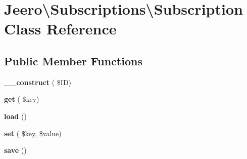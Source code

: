\hypertarget{classJeero_1_1Subscriptions_1_1Subscription}{}\section{Jeero\textbackslash{}Subscriptions\textbackslash{}Subscription Class Reference}
\label{classJeero_1_1Subscriptions_1_1Subscription}
\subsection*{Public Member Functions}
\begin{DoxyCompactItemize}
\item 
\mbox{\label{classJeero_1_1Subscriptions_1_1Subscription_add02e9200cef0f2597062722a7d6af8c}} 
{\bfseries \+\_\+\+\_\+construct} ( \$ID)
\item 
\mbox{\label{classJeero_1_1Subscriptions_1_1Subscription_a34e23235e49be695c2237f5e1ed45f10}} 
{\bfseries get} ( \$key)
\item 
\mbox{\label{classJeero_1_1Subscriptions_1_1Subscription_a131d71552c91f1eb7cb79d2557fb7406}} 
{\bfseries load} ()
\item 
\mbox{\label{classJeero_1_1Subscriptions_1_1Subscription_aba96547151a8c16a7bb5eb2384fea405}} 
{\bfseries set} ( \$key, \$value)
\item 
\mbox{\label{classJeero_1_1Subscriptions_1_1Subscription_ae20551c7756dca165baeb6f817729202}} 
{\bfseries save} ()
\end{DoxyCompactItemize}
